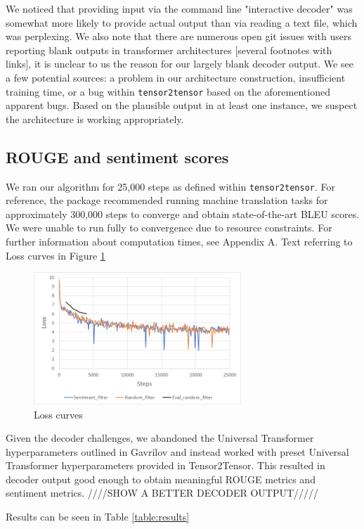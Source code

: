 \documentclass[11pt]{article}
\begin{document}
We noticed that providing input via the command line "interactive decoder" was somewhat more likely to provide actual output than via reading a text file, which was perplexing. We also note that there are numerous open git issues with users reporting blank outputs in transformer architectures [several footnotes with links], it is unclear to us the reason for our largely blank decoder output. We see a few potential sources: a problem in our architecture construction, insufficient training time, or a bug within \texttt{tensor2tensor} based on the aforementioned apparent bugs. Based on the plausible output in at least one instance, we suspect the architecture is working appropriately.

\subsection{ROUGE and sentiment scores}

We ran our algorithm for 25,000 steps as defined within \texttt{tensor2tensor}. For reference, the package recommended running machine translation tasks for approximately 300,000 steps to converge and obtain state-of-the-art BLEU scores. We were unable to run fully to convergence due to resource constraints. For further information about computation times, see Appendix A. Text referring to Loss curves in Figure \ref{figure:loss}

\begin{figure}
  \centering
  \includegraphics[width=7.8cm]{loss.png}
  \caption{Loss curves}
  \label{figure:loss}
\end{figure}

Given the decoder challenges, we abandoned the Universal Transformer hyperparameters outlined in Gavrilov and instead worked with preset Universal Transformer hyperparameters provided in Tensor2Tensor. This resulted in decoder output good enough to obtain meaningful ROUGE metrics and sentiment metrics. 
////SHOW A BETTER DECODER OUTPUT/////

Results can be seen in Table \ref{table:results}
\end{document}
